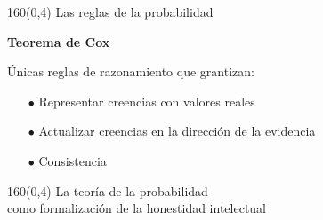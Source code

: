 \documentclass[shownotes,aspectratio=169]{beamer}
\begin{document}
 \begin{frame}[plain]
 \begin{textblock}{160}(0,4)
  \centering \LARGE Las reglas de la probabilidad
 \end{textblock}
 
 
\vspace{1.2cm}
 
  \textbf{Teorema de Cox} \\ 
  
  \vspace{0.3cm}
  
  \'Unicas reglas de razonamiento que grantizan:
\begin{itemize}
 \item[$\bullet$] Representar creencias con valores reales 
 \item[$\bullet$] Actualizar creencias en la direcci\'on de la evidencia
 \item[$\bullet$] Consistencia
 \end{itemize}
 
 
%  
 \end{frame}

 
\begin{frame}[plain]
\begin{textblock}{160}(0,4)
\centering \LARGE La teoría de la probabilidad \\ \Large como formalización de la honestidad intelectual
\end{textblock}
\vspace{0.75cm}


\end{frame}
 
\end{document}
